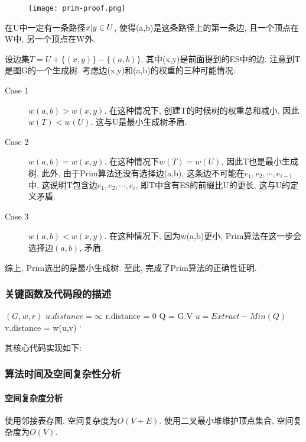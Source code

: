 \begin{wrapfigure}{r}{0.5\textwidth}
	\begin{center}
		\texttt{[image: prim-proof.png]}
	\end{center}
	\label{fig:prim-proof}
\end{wrapfigure}

在U中一定有一条路径$x\arrowvert y\in U$, 使得(a,b)是这条路径上的第一条边,
且一个顶点在W中, 另一个顶点在W外.

设边集$T=U+\{(x,y)\}-\{(a,b)\}$, 其中(x,y)是前面提到的ES中的边.
注意到T是图G的一个生成树. 考虑边(x,y)和(a,b)的权重的三种可能情况:
\begin{description}
	\item[Case 1]  $w(a,b) > w(x,y)$. 在这种情况下, 创建T的时候树的权重总和减小,
		因此$w(T) < w(U)$. 这与U是最小生成树矛盾.
	\item[Case 2] $w(a,b) = w(x,y)$. 在这种情况下$w(T)=w(U)$, 因此T也是最小生成树.
		此外, 由于Prim算法还没有选择边(a,b), 这条边不可能在$e_1,e_2,\cdots,
			e_{i-1}$中. 这说明T包含边$e_1,e_2,\cdots,e_i$, 即T中含有ES的前缀比U的更长,
		这与U的定义矛盾.
	\item[Case 3] $w(a,b)<w(x,y)$. 在这种情况下, 因为w(a,b)更小,
		Prim算法在这一步会选择边$(a,b)$, 矛盾.
\end{description}
综上, Prim选出的是最小生成树. 至此, 完成了Prim算法的正确性证明.

\subsubsection{关键函数及代码段的描述}
\begin{algorithm}
	\begin{algorithmic}
		\Require $(G, w, r)$
		\State $u.distance = \infty$
		\EndFor
		\State r.distance = 0
		\State Q = G.V
		\State $u = Extract-Min(Q)$
		\State v.distance = w(u,v)
		\EndIf`
		\EndFor
		\EndWhile
	\end{algorithmic}
\end{algorithm}
其核心代码实现如下:


\subsubsection{算法时间及空间复杂性分析}
\paragraph{空间复杂度分析}
使用邻接表存图, 空间复杂度为$O(V+E)$. 使用二叉最小堆维护顶点集合,
空间复杂度为$O(V)$.

